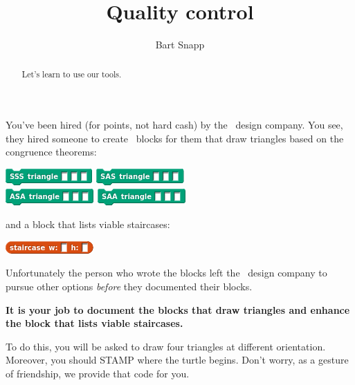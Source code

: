 \documentclass[noauthor,nooutcomes,12pt,hints]{ximera}
\title{Quality control}
\author{Bart Snapp}
\begin{document}
\begin{abstract}
  Let's learn to use our tools.
\end{abstract}
\maketitle

\begin{listOutcomes}
\item 
\end{listOutcomes}

You've been hired (for points, not hard cash) by the \mooculus\ design
company. You see, they hired someone to create \snap\ blocks for them
that draw triangles based on the congruence theorems:
\begin{center}
  \includegraphics{SSSblank.png} \qquad \includegraphics{SASblank.png} \\[5mm]
  \includegraphics{ASAblank.png} \qquad \includegraphics{SAAblank.png}
\end{center}
and a block that lists viable staircases:
\begin{center}
  \includegraphics{staircaseBlank.png}
\end{center}

Unfortunately the person who wrote the blocks left the
\mooculus\ design company to pursue other options \textit{before} they
documented their blocks.

\textbf{It is your job to document the blocks that draw triangles and enhance
  the block that lists viable staircases.}

To do this, you will be asked to draw four triangles at different
orientation. Moreover, you should STAMP where the turtle begins. Don't
worry, as a gesture of friendship, we provide that code for you.


\mynewpage
\end{document}
